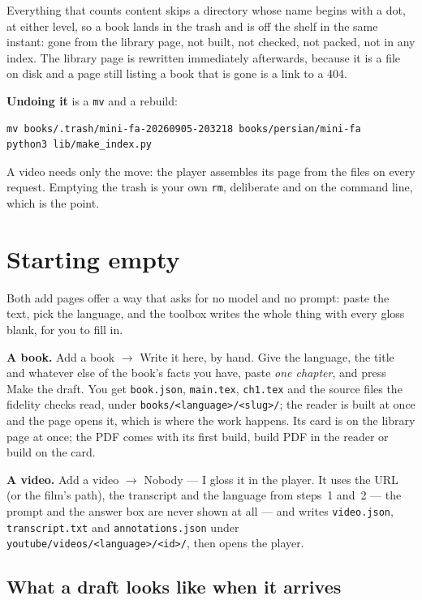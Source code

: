 \documentclass[11pt,oneside]{report}
\newcommand{\file}[1]{\texttt{#1}}
\newcommand{\menu}[1]{\textsf{#1}}
\begin{document}
Everything that counts content skips a directory whose name begins with a dot,
at either level, so a book lands in the trash and is off the shelf in the same
instant: gone from the library page, not built, not checked, not packed, not
in any index. The library page is rewritten immediately afterwards, because it
is a file on disk and a page still listing a book that is gone is a link to a
404.

\textbf{Undoing it} is a \texttt{mv} and a rebuild:

\begin{lstlisting}
mv books/.trash/mini-fa-20260905-203218 books/persian/mini-fa
python3 lib/make_index.py
\end{lstlisting}

\noindent A video needs only the move: the player assembles its page from the
files on every request. Emptying the trash is your own \texttt{rm}, deliberate
and on the command line, which is the point.

\section{Starting empty}
\label{sec:empty}

Both add pages offer a way that asks for no model and no prompt: paste
the text, pick the language, and the toolbox writes the whole thing with every
gloss blank, for you to fill in.

\textbf{A book.} \menu{Add a book} $\rightarrow$ \menu{Write it here, by hand}.
Give the language, the title and whatever else of the book's facts you have,
paste \emph{one chapter}, and press \menu{Make the draft}. You get
\file{book.json}, \file{main.tex}, \file{ch1.tex} and the source files the
fidelity checks read, under \file{books/<language>/<slug>/}; the reader is
built at once and the page opens it, which is where the work happens. Its
card is on the library page at once; the PDF comes with its first build,
\menu{build PDF} in the reader or \menu{build} on the card.

\textbf{A video.} \menu{Add a video} $\rightarrow$ \menu{Nobody --- I gloss it
in the player}. It uses the URL (or the film's path), the transcript and the
language from steps~1 and~2 --- the prompt and the answer box are never shown
at all --- and writes
\file{video.json}, \file{transcript.txt} and \file{annotations.json} under
\file{youtube/videos/<language>/<id>/}, then opens the player.

\subsection*{What a draft looks like when it arrives}
\end{document}
